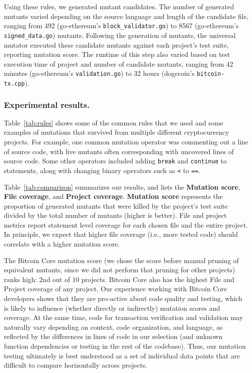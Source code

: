 Using these rules, we generated mutant candidates. The number of generated mutants varied depending
on the source language and length of the candidate file, ranging from
492 (go-ethereum's {\tt block\_validator.go}) to
8567 (go-ethereum's {\tt signed\_data.go}) mutants. Following the generation of mutants, the universal mutator
executed these candidate mutants against each project's test suite, reporting mutation score. The runtime
of this step also varied based on test execution time of project and number of candidate mutants, ranging from
42 minutes (go-ethereum's {\tt validation.go}) to 32 hours (dogecoin's
{\tt bitcoin-tx.cpp}).

\subsubsection*{Experimental results.}

Table~\ref{tab:rules} shows some of the common rules that we used and some examples of mutations that survived
from multiple different cryptocurrency projects. For example, one common mutation operator was commenting out a line
of source code, with live mutants often corresponding with uncovered lines of source code. Some other operators
included adding {\tt break} and {\tt continue} to statements, along with changing binary operators such as \texttt{<} to \texttt{==}.

Table~\ref{tab:comparison} summarizes our results, and lists the
\textbf{Mutation score}, \textbf{File coverage}, and \textbf{Project coverage}. \textbf{Mutation score} represents the proportion of
generated mutants that were killed by the project's test suite divided by the total number
of mutants (higher is better). File and project metrics report statement level coverage
for each chosen file and the entire project. In principle, we expect that higher file coverage
(i.e., more tested code) should correlate with a higher mutation
score.

The Bitcoin Core mutation score (we chose the score before manual
pruning of equivalent mutants, since we did not perform that pruning
for other projects) ranks high: 2nd out of 10 projects. Bitcoin Core
also has the highest File and Project coverage of any project.  Our experience
working with Bitcoin Core developers shows that they are pro-active about code
quality and testing, which is likely to influence (whether directly or
indirectly) mutation scores and coverage.  At the same time, code
for transaction verification and validation may naturally vary depending on
context, code organization, and language, as reflected by the differences in
lines of code in our selection (and unknown function dependencies or testing in
the rest of the codebase). Thus, our mutation testing
ultimately is best understood as a set of individual data points that are difficult to compare
horizontally across projects.
%



